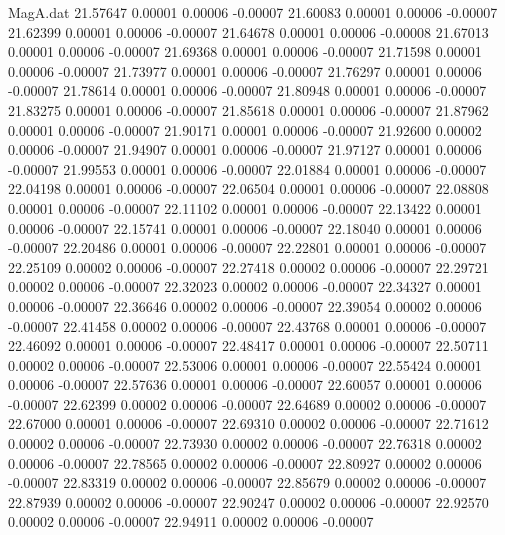 \begin{filecontents}{MagA.dat}
  21.57647    0.00001    0.00006   -0.00007
  21.60083    0.00001    0.00006   -0.00007
  21.62399    0.00001    0.00006   -0.00007
  21.64678    0.00001    0.00006   -0.00008
  21.67013    0.00001    0.00006   -0.00007
  21.69368    0.00001    0.00006   -0.00007
  21.71598    0.00001    0.00006   -0.00007
  21.73977    0.00001    0.00006   -0.00007
  21.76297    0.00001    0.00006   -0.00007
  21.78614    0.00001    0.00006   -0.00007
  21.80948    0.00001    0.00006   -0.00007
  21.83275    0.00001    0.00006   -0.00007
  21.85618    0.00001    0.00006   -0.00007
  21.87962    0.00001    0.00006   -0.00007
  21.90171    0.00001    0.00006   -0.00007
  21.92600    0.00002    0.00006   -0.00007
  21.94907    0.00001    0.00006   -0.00007
  21.97127    0.00001    0.00006   -0.00007
  21.99553    0.00001    0.00006   -0.00007
  22.01884    0.00001    0.00006   -0.00007
  22.04198    0.00001    0.00006   -0.00007
  22.06504    0.00001    0.00006   -0.00007
  22.08808    0.00001    0.00006   -0.00007
  22.11102    0.00001    0.00006   -0.00007
  22.13422    0.00001    0.00006   -0.00007
  22.15741    0.00001    0.00006   -0.00007
  22.18040    0.00001    0.00006   -0.00007
  22.20486    0.00001    0.00006   -0.00007
  22.22801    0.00001    0.00006   -0.00007
  22.25109    0.00002    0.00006   -0.00007
  22.27418    0.00002    0.00006   -0.00007
  22.29721    0.00002    0.00006   -0.00007
  22.32023    0.00002    0.00006   -0.00007
  22.34327    0.00001    0.00006   -0.00007
  22.36646    0.00002    0.00006   -0.00007
  22.39054    0.00002    0.00006   -0.00007
  22.41458    0.00002    0.00006   -0.00007
  22.43768    0.00001    0.00006   -0.00007
  22.46092    0.00001    0.00006   -0.00007
  22.48417    0.00001    0.00006   -0.00007
  22.50711    0.00002    0.00006   -0.00007
  22.53006    0.00001    0.00006   -0.00007
  22.55424    0.00001    0.00006   -0.00007
  22.57636    0.00001    0.00006   -0.00007
  22.60057    0.00001    0.00006   -0.00007
  22.62399    0.00002    0.00006   -0.00007
  22.64689    0.00002    0.00006   -0.00007
  22.67000    0.00001    0.00006   -0.00007
  22.69310    0.00002    0.00006   -0.00007
  22.71612    0.00002    0.00006   -0.00007
  22.73930    0.00002    0.00006   -0.00007
  22.76318    0.00002    0.00006   -0.00007
  22.78565    0.00002    0.00006   -0.00007
  22.80927    0.00002    0.00006   -0.00007
  22.83319    0.00002    0.00006   -0.00007
  22.85679    0.00002    0.00006   -0.00007
  22.87939    0.00002    0.00006   -0.00007
  22.90247    0.00002    0.00006   -0.00007
  22.92570    0.00002    0.00006   -0.00007
  22.94911    0.00002    0.00006   -0.00007

\end{filecontents}
